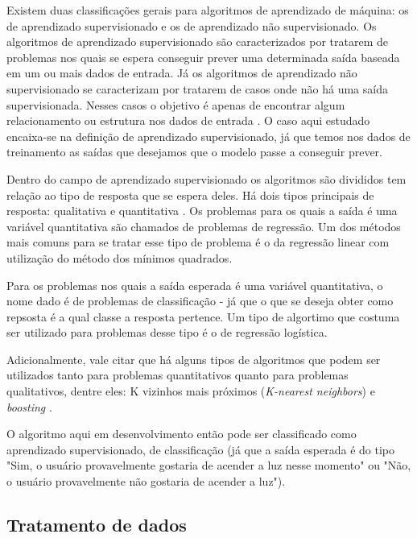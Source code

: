 			Existem duas classificações gerais para algoritmos de aprendizado de máquina: os de aprendizado supervisionado e os de aprendizado não supervisionado. Os algoritmos de aprendizado supervisionado são caracterizados por tratarem de problemas nos quais se espera conseguir prever uma determinada saída baseada em um ou mais dados de entrada. Já os algoritmos de aprendizado não supervisionado se caracterizam por tratarem de casos onde não há uma saída supervisionada. Nesses casos o objetivo é apenas de encontrar algum relacionamento ou estrutura nos dados de entrada \cite{islr}. O caso aqui estudado encaixa-se na definição de aprendizado supervisionado, já que temos nos dados de treinamento as saídas que desejamos que o modelo passe a conseguir prever.

			Dentro do campo de aprendizado supervisionado os algoritmos são divididos tem relação ao tipo de resposta que se espera deles. Há dois tipos principais de resposta: qualitativa e quantitativa  \cite{islr}. Os problemas para os quais a saída é uma variável quantitativa são chamados de problemas de regressão. Um dos métodos mais comuns para se tratar esse tipo de problema é o da regressão linear com utilização do método dos mínimos quadrados.

			Para os problemas nos quais a saída esperada é uma variável quantitativa, o nome dado é de problemas de classificação - já que o que se deseja obter como repsosta é a qual classe a resposta pertence. Um tipo de algortimo que costuma ser utilizado para problemas desse tipo é o de regressão logística.

			Adicionalmente, vale citar que há alguns tipos de algoritmos que podem ser utilizados tanto para problemas quantitativos quanto para problemas qualitativos, dentre eles: K vizinhos mais próximos (\emph{K-nearest neighbors}) e \emph{boosting} \cite{islr}.

			O algoritmo aqui em desenvolvimento então pode ser classificado como aprendizado supervisionado, de classificação (já que a saída esperada é do tipo "Sim, o usuário provavelmente gostaria de acender a luz nesse momento" ou "Não, o usuário provavelmente não gostaria de acender a luz").

		\subsection{Tratamento de dados}

